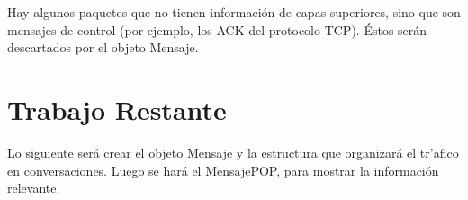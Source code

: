 \documentclass[titlepage]{article}
\begin{document}
Hay algunos paquetes que no tienen informaci\'on de capas superiores, sino que
son mensajes de control (por ejemplo, los ACK del protocolo TCP). \'Estos
ser\'an descartados por el objeto \textsf{Mensaje}.

\section{Trabajo Restante}

Lo siguiente ser\'a crear el objeto \textsf{Mensaje} y la estructura que
organizar\'a el tr'afico en conversaciones. Luego se har\'a el
\textsf{MensajePOP}, para mostrar la informaci\'on relevante.
\end{document}
